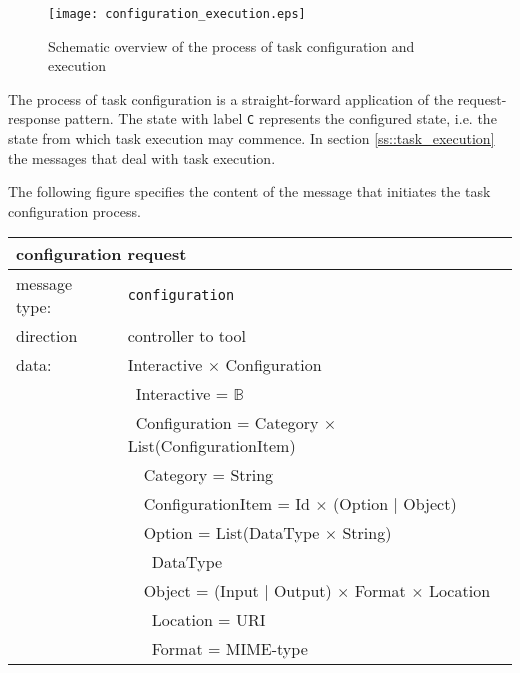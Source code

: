 \documentclass{article}
\newcommand{\msg}[1]{\texttt{#1}}
\begin{document}
   \begin{figure}[H]
    \begin{center}
     \texttt{[image: configuration\_execution.eps]}
    \end{center}
    \vspace{-0.3cm}
    \label{fig:configuration_execution}
    \caption{Schematic overview of the process of task configuration and execution}
   \end{figure}

   The process of task configuration is a straight-forward application of the
   request-response pattern. The state with label \texttt{C} represents the
   configured state, i.e. the state from which task execution may commence. In
   section \ref{ss::task_execution} the messages that deal with task execution.

   
   The following figure specifies the content of the message that initiates the
   task configuration process.
   \begin{table}[H]
    \begin{center}
     \begin{tabular}{|ll|}
      \hline
       \multicolumn{2}{|l|}{\textbf{configuration request}} \\
      \hline
       message type:   & \msg{configuration} \\
      \hline
       direction       & controller to tool \\
       data:           & Interactive $\times$ Configuration \\
                       & \ Interactive = $\mathbb{B}$ \\
                       & \ Configuration = Category $\times$ List(ConfigurationItem) \\
                       & \ \ Category = String \\
                       & \ \ ConfigurationItem = Id $\times$ (Option $|$ Object) \\
                       & \ \ Option = List(DataType $\times$ String) \\
                       & \ \ \ DataType \\
                       & \ \ Object = (Input $|$ Output) $\times$ Format $\times$ Location \\
                       & \ \ \ Location = URI \\
                       & \ \ \ Format   = MIME-type \\
      \hline
     \end{tabular}
     \vspace{-0.3cm}
    \end{center}
   \end{table}
\end{document}

